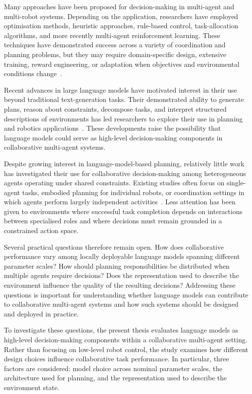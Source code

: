 Many approaches have been proposed for decision-making in multi-agent and multi-robot systems. Depending on the application, researchers have employed optimisation methods, heuristic approaches, rule-based control, task-allocation algorithms, and more recently multi-agent reinforcement learning. These techniques have demonstrated success across a variety of coordination and planning problems, but they may require domain-specific design, extensive training, reward engineering, or adaptation when objectives and environmental conditions change~\cite{gerkey2004formal,sharon2015conflict,papoudakis2021benchmarking}.


Recent advances in large language models have motivated interest in their use beyond traditional text-generation tasks. Their demonstrated ability to generate plans, reason about constraints, decompose tasks, and interpret structured descriptions of environments has led researchers to explore their use in planning and robotics applications~\cite{huang2022lmp,ahn2022do,liang2022code}. These developments raise the possibility that language models could serve as high-level decision-making components in collaborative multi-agent systems.

Despite growing interest in language-model-based planning, relatively little work has investigated their use for collaborative decision-making among heterogeneous agents operating under shared constraints. Existing studies often focus on single-agent tasks, embodied planning for individual robots, or coordination settings in which agents perform largely independent activities~\cite{huang2022lmp,ahn2022do,mandi2024roco}. Less attention has been given to environments where successful task completion depends on interactions between specialised roles and where decisions must remain grounded in a constrained action space.


Several practical questions therefore remain open. How does collaborative performance vary among locally deployable language models spanning different parameter scales? How should planning responsibilities be distributed when multiple agents require decisions? Does the representation used to describe the environment influence the quality of the resulting decisions? Addressing these questions is important for understanding whether language models can contribute to collaborative multi-agent systems and how such systems should be designed and deployed in practice.


To investigate these questions, the present thesis evaluates language models as high-level decision-making components within a collaborative multi-agent setting. Rather than focusing on low-level robot control, the study examines how different design choices influence collaborative task performance. In particular, three factors are considered: model choice across nominal parameter scales, the architecture used for planning, and the representation used to describe the environment state.

